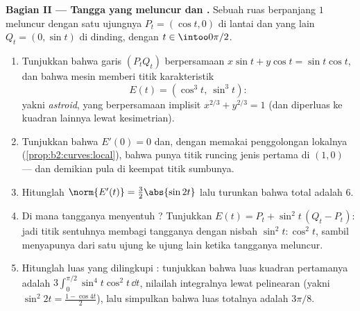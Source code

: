 \begin{problem}
\medskip
\noindent\textbf{Bagian II --- Tangga yang meluncur dan
.} Sebuah ruas berpanjang $1$ meluncur dengan satu ujungnya $P_t =
(\cos t, 0)$ di lantai dan yang lain $Q_t = (0, \sin t)$ di
dinding, dengan $t \in \intoo0{\pi/2}$.
\begin{enumerate}[resume]
  \item Tunjukkan bahwa garis $(P_tQ_t)$ berpersamaan $x\sin t +
        y\cos t = \sin t\cos t$, dan bahwa mesin 
        memberi titik karakteristik
        \[
        E(t) = (\cos^3 t,\ \sin^3 t) :
        \]
        yakni \emph{astroid}, yang berpersamaan
        implisit $x^{2/3} + y^{2/3} = 1$ (dan diperluas ke
        kuadran lainnya lewat kesimetrian).
  \item Tunjukkan bahwa $E'(0) = 0$ dan, dengan memakai penggolongan
        lokalnya (\cref{prop:b2:curves:local}), bahwa
         punya titik runcing jenis pertama di $(1, 0)$
        --- dan demikian pula di keempat titik sumbunya.
  \item Hitunglah $\norm{E'(t)} = \tfrac32\abs{\sin 2t}$ lalu
        turunkan bahwa  total  adalah $6$.
  \item Di mana tangganya menyentuh ? Tunjukkan $E(t) =
        P_t + \sin^2 t\,(Q_t - P_t)$: jadi titik sentuhnya
        membagi tangganya dengan nisbah $\sin^2 t : \cos^2
        t$, sambil menyapunya dari satu ujung ke ujung lain ketika
        tangganya meluncur.
  \item Hitunglah luas yang dilingkupi : tunjukkan bahwa
        luas kuadran pertamanya adalah $3\int_0^{\pi/2}\sin^4
        t\cos^2 t\,\dd t$, nilailah integralnya lewat
        pelinearan (yakni $\sin^2 2t = \tfrac{1 - \cos 4t}2$),
        lalu simpulkan bahwa luas totalnya adalah $3\pi/8$.
\end{enumerate}


\end{problem}
